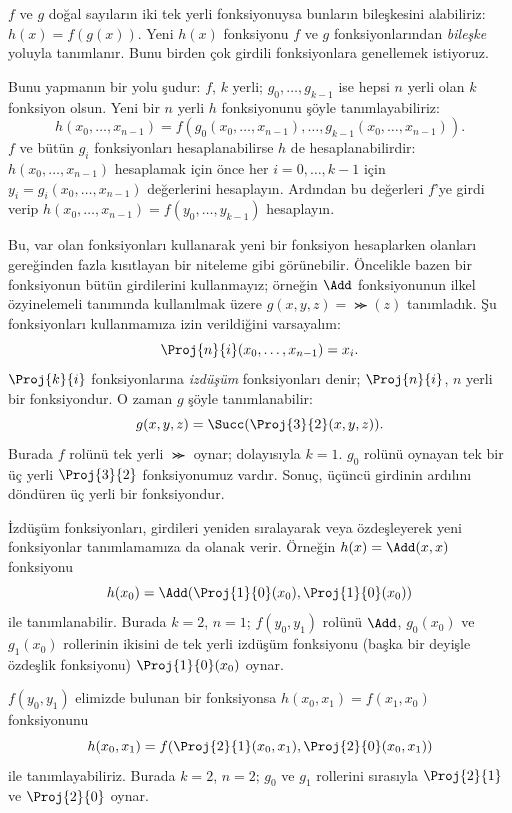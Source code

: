 \documentclass[../../../include/open-logic-section]{subfiles}
\begin{document}

$f$ ve $g$ doğal sayıların iki tek yerli fonksiyonuysa bunların
bileşkesini alabiliriz: $h(x)=f(g(x))$. Yeni $h(x)$ fonksiyonu $f$ ve
$g$ fonksiyonlarından \emph{bileşke} yoluyla tanımlanır. Bunu birden
çok girdili fonksiyonlara genellemek istiyoruz.

Bunu yapmanın bir yolu şudur: $f$, $k$ yerli; $g_0,\dots,g_{k-1}$ ise
hepsi $n$ yerli olan $k$ fonksiyon olsun. Yeni bir $n$ yerli $h$
fonksiyonunu şöyle tanımlayabiliriz:
\[
h(x_0, \dots, x_{n-1}) =
f(g_0(x_0, \dots, x_{n-1}), \dots, g_{k-1}(x_0, \dots, x_{n-1})).
\]
$f$ ve bütün $g_i$ fonksiyonları hesaplanabilirse $h$ de
hesaplanabilirdir: $h(x_0,\dots,x_{n-1})$ hesaplamak için önce her
$i=0,\dots,k-1$ için $y_i=g_i(x_0,\dots,x_{n-1})$ değerlerini
hesaplayın. Ardından bu değerleri $f$'ye girdi verip
$h(x_0,\dots,x_{n-1})=f(y_0,\dots,y_{k-1})$ hesaplayın.

Bu, var olan fonksiyonları kullanarak yeni bir fonksiyon hesaplarken
olanları gereğinden fazla kısıtlayan bir niteleme gibi görünebilir.
Öncelikle bazen bir fonksiyonun bütün girdilerini kullanmayız; örneğin
$\Add$ fonksiyonunun ilkel özyinelemeli tanımında kullanılmak üzere
$g(x,y,z)=\Succ(z)$ tanımladık. Şu fonksiyonları kullanmamıza izin
verildiğini varsayalım:
\[
\Proj{n}{i}(x_0, \dots, x_{n-1}) = x_i.
\]
$\Proj{k}{i}$ fonksiyonlarına \emph{izdüşüm} fonksiyonları denir;
$\Proj{n}{i}$, $n$ yerli bir fonksiyondur. O zaman $g$ şöyle
tanımlanabilir:
\[
g(x, y, z) = \Succ(\Proj{3}{2}(x, y, z)).
\]
Burada $f$ rolünü tek yerli $\Succ$ oynar; dolayısıyla $k=1$.
$g_0$ rolünü oynayan tek bir üç yerli $\Proj{3}{2}$ fonksiyonumuz
vardır. Sonuç, üçüncü girdinin ardılını döndüren üç yerli bir
fonksiyondur.

İzdüşüm fonksiyonları, girdileri yeniden sıralayarak veya özdeşleyerek
yeni fonksiyonlar tanımlamamıza da olanak verir. Örneğin
$h(x)=\Add(x,x)$ fonksiyonu
\[
h(x_0)=\Add(\Proj{1}{0}(x_0),\Proj{1}{0}(x_0))
\]
ile tanımlanabilir. Burada $k=2$, $n=1$; $f(y_0,y_1)$ rolünü $\Add$,
$g_0(x_0)$ ve $g_1(x_0)$ rollerinin ikisini de tek yerli izdüşüm
fonksiyonu (başka bir deyişle özdeşlik fonksiyonu)
$\Proj{1}{0}(x_0)$ oynar.

$f(y_0,y_1)$ elimizde bulunan bir fonksiyonsa
$h(x_0,x_1)=f(x_1,x_0)$ fonksiyonunu
\[
h(x_0, x_1) = f(\Proj{2}{1}(x_0, x_1),\Proj{2}{0}(x_0, x_1))
\]
ile tanımlayabiliriz. Burada $k=2$, $n=2$; $g_0$ ve $g_1$ rollerini
sırasıyla $\Proj{2}{1}$ ve $\Proj{2}{0}$ oynar.
\end{document}
